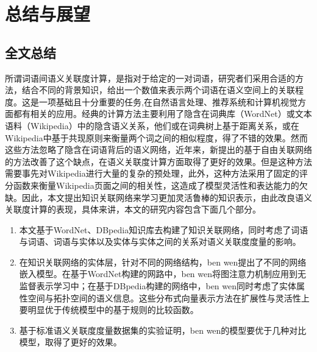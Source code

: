 \chapter{总结与展望}
\label{chap:chap07}

\section{全文总结}

所谓词语间语义关联度计算，是指对于给定的一对词语，研究者们采用合适的方法，结合不同的背景知识，给出一个数值来表示两个词语在语义空间上的关联程度。这是一项基础且十分重要的任务,在自然语言处理、推荐系统和计算机视觉方面都有相关的应用。经典的计算方法主要利用了隐含在词典库（WordNet）或文本语料（Wikipedia）中的隐含语义关系，他们或在词典树上基于距离关系，或在Wikipedia中基于共现原则来衡量两个词之间的相似程度，得了不错的效果。然而这些方法忽略了隐含在词语背后的语义网络，近年来，新提出的基于自由关联网络的方法改善了这个缺点，在语义关联度计算方面取得了更好的效果。但是这种方法需要事先对Wikipedia进行大量的复杂的预处理，此外，这种方法采用了固定的评分函数来衡量Wikipedia页面之间的相关性，这造成了模型灵活性和表达能力的欠缺。因此，本文提出知识关联网络来学习更加灵活鲁棒的知识表示，由此改良语义关联度计算的表现，具体来讲，本文的研究内容包含下面几个部分。
\begin{enumerate}
    \item 本文基于WordNet、DBpedia知识库去构建了知识关联网络，同时考虑了词语与词语、词语与实体以及实体与实体之间的关系对语义关联度度量的影响。
    \item 在知识关联网络的实体层，针对不同的网络结构，ben wen提出了不同的网络嵌入模型。在基于WordNet构建的网路中，ben wen将图注意力机制应用到无监督表示学习中；在基于DBpedia构建的网络中，ben wen同时考虑了实体属性空间与拓扑空间的语义信息。这些分布式向量表示方法在扩展性与灵活性上要明显优于传统模型中的基于规则的比较函数。
    \item 基于标准语义关联度度量数据集的实验证明，ben wen的模型要优于几种对比模型，取得了更好的效果。
\end{enumerate}

